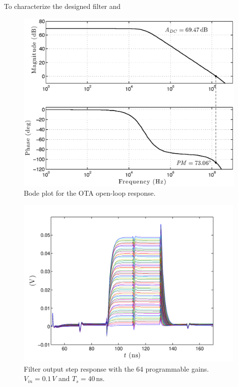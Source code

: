 To characterize the designed filter and 
\begin{figure}[!t]
	\centering
	\includegraphics[width=5.3in]{./Test/bode_OTA_post}
	\caption{Bode plot for the OTA open-loop response.}\label{fig:bode_OTA}
\end{figure}


\begin{figure}[!t]
	\centering
	\includegraphics[width=4.4in]{./Test/gain_curves.pdf}
	\caption{Filter output step response with the 64 programmable gains. \mbox{$V_\textit{in}=0.1\,V$} and \mbox{$T_s=40\,\text{ns}$}.}\label{fig:gain_curves}
\end{figure}

